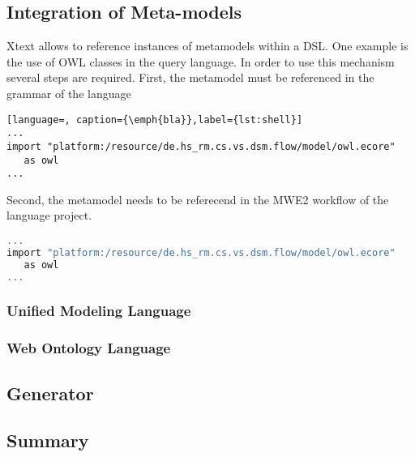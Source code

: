 \subsection{Integration of Meta-models}
Xtext allows to reference instances of metamodels within a DSL. One example is 
the use of OWL classes in the query language. In order to use this mechanism 
several steps are required. First, the metamodel must be referenced in the 
grammar of the language
\begin{lstlisting}[language=, caption={\emph{bla}},label={lst:shell}]
...
import "platform:/resource/de.hs_rm.cs.vs.dsm.flow/model/owl.ecore"
   as owl
...
\end{lstlisting}
Second, the metamodel needs to be referecend in the MWE2 workflow of the 
language project.
\begin{lstlisting}[language=C, caption={\emph{bla}},label={lst:shell}]
...
import "platform:/resource/de.hs_rm.cs.vs.dsm.flow/model/owl.ecore"
   as owl
...
\end{lstlisting}

\subsubsection{Unified Modeling Language}
\subsubsection{Web Ontology Language}
\subsection{Generator}
\subsection{Summary}
